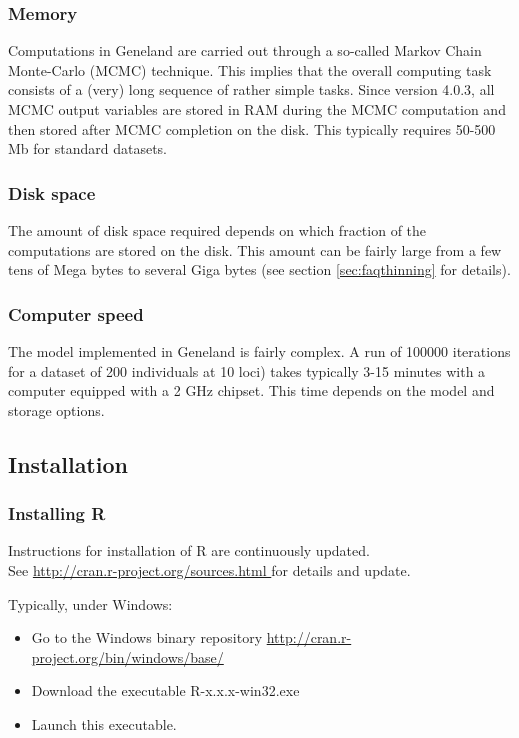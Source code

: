 \documentclass[a4paper,10pt]{article}
\begin{document}
\subsubsection{Memory}
Computations in {\sc Geneland} are carried out through a so-called Markov Chain Monte-Carlo (MCMC) technique. This implies that the 
overall computing task consists of a (very) long sequence of rather simple tasks. %
Since version 4.0.3, all MCMC output variables are stored in RAM during the MCMC computation and then stored after MCMC completion on the disk. 
This typically requires 50-500 Mb for standard datasets.

\subsubsection{Disk space}
The amount of disk space required depends on which fraction of the computations are stored on the disk. 
This amount can be fairly large from a few tens of Mega bytes to several Giga bytes 
(see section \ref{sec:faqthinning} for details). 

\subsubsection{Computer speed}
The model implemented in {\sc Geneland} is fairly complex. A  run of 100000 iterations for a dataset of 200 individuals at 10 loci) 
takes typically 3-15 minutes with a computer equipped with a 2 GHz chipset. This time depends on the 
model and storage options.



\subsection{Installation}

\subsubsection{Installing R}
Instructions for installation of R are continuously updated.\\
See \url{ http://cran.r-project.org/sources.html } for details and update.
 
Typically, under Windows:
\begin{itemize}
\item Go to the Windows binary repository \url{http://cran.r-project.org/bin/windows/base/}
\item Download the executable R-x.x.x-win32.exe  
\item Launch this executable.
\end{itemize}   
\end{document}
